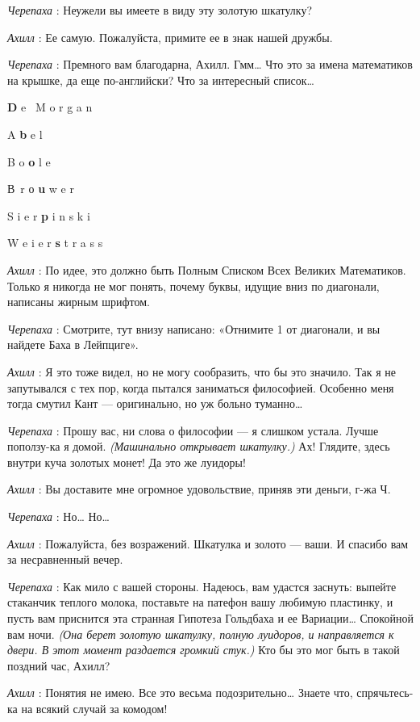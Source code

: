 \documentclass[../main.tex]{subfiles}
\begin{document}
\begin{dialogue}
\emph{Черепаха} : Неужели вы имеете в виду эту золотую шкатулку?

\emph{Ахилл} : Ее самую. Пожалуйста, примите ее в знак нашей дружбы.

\emph{Черепаха} : Премного вам благодарна, Ахилл. Гмм\ldots{} Что это за имена математиков на крышке, да еще по-английски? Что за интересный список\ldots{}

\textbf{D} e ~M o r g a n

A \textbf{b} e l

B o \textbf{o} l e

В~r о \textbf{u} w e r

S i e r \textbf{p} i n s k i

W e i e r \textbf{s} t r a s s

\emph{Ахилл} : По идее, это должно быть Полным Списком Всех Великих Математиков. Только я никогда не мог понять, почему буквы, идущие вниз по диагонали, написаны жирным шрифтом.

\emph{Черепаха} : Смотрите, тут внизу написано: «Отнимите 1 от диагонали, и вы найдете Баха в Лейпциге».

\emph{Ахилл} : Я это тоже видел, но не могу сообразить, что бы это значило. Так я не запутывался с тех пор, когда пытался заниматься философией. Особенно меня тогда смутил Кант --- оригинально, но уж больно туманно\ldots{}

\emph{Черепаха} : Прошу вас, ни слова о философии --- я слишком устала. Лучше поползу-ка я домой. \emph{(Машинально открывает шкатулку.)} Ах! Глядите, здесь внутри куча золотых монет! Да это же луидоры!

\emph{Ахилл} : Вы доставите мне огромное удовольствие, приняв эти деньги, г-жа Ч.

\emph{Черепаха} : Но\ldots{} Но\ldots{}

\emph{Ахилл} : Пожалуйста, без возражений. Шкатулка и золото --- ваши. И спасибо вам за несравненный вечер.

\emph{Черепаха} : Как мило с вашей стороны. Надеюсь, вам удастся заснуть: выпейте стаканчик теплого молока, поставьте на патефон вашу любимую пластинку, и пусть вам приснится эта странная Гипотеза Гольдбаха и ее Вариации\ldots{} Спокойной вам ночи. \emph{(Она берет золотую шкатулку, полную луидоров, и направляется к двери. В этот момент раздается громкий стук.)} Кто бы это мог быть в такой поздний час, Ахилл?

\emph{Ахилл} : Понятия не имею. Все это весьма подозрительно\ldots{} Знаете что, спрячьтесь-ка на всякий случай за комодом!


\end{dialogue}
\end{document}
